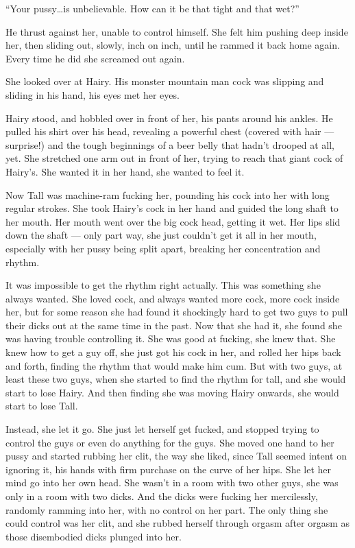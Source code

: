 \documentclass[letterpaper]{article}
\begin{document}
``Your pussy\ldots is unbelievable. How can it be that tight and that wet?''

He thrust against her, unable to control himself.
She felt him pushing deep inside her, then sliding out, slowly, inch on inch, until he rammed it back home again.
Every time he did she screamed out again.

She looked over at Hairy.
His monster mountain man cock was slipping and sliding in his hand, his eyes met her eyes.

Hairy stood, and hobbled over in front of her, his pants around his ankles.
He pulled his shirt over his head, revealing a powerful chest (covered with hair --- surprise!) and the tough beginnings of a beer belly that hadn't drooped at all, yet.
She stretched one arm out in front of her, trying to reach that giant cock of Hairy's. She wanted it in her hand, she wanted to feel it.

Now Tall was machine-ram fucking her, pounding his cock into her with long regular strokes.
She took Hairy's cock in her hand and guided the long shaft to her mouth.
Her mouth went over the big cock head, getting it wet.
Her lips slid down the shaft --- only part way, she just couldn't get it all in her mouth, especially with her pussy being split apart, breaking her concentration and rhythm.

It was impossible to get the rhythm right actually.
This was something she always wanted. 
She loved cock, and always wanted more cock, more cock inside her, but for some reason she had found it shockingly hard to get two guys to pull their dicks out at the same time in the past.
Now that she had it, she found she was having trouble controlling it.
She was good at fucking, she knew that.
She knew how to get a guy off, she just got his cock in her, and rolled her hips back and forth, finding the rhythm that would make him cum.
But with two guys, at least these two guys, when she started to find the rhythm for tall, and she would start to lose Hairy.
And then finding she was moving Hairy onwards, she would start to lose Tall.

Instead, she let it go. She just let herself get fucked, and stopped trying to control the guys or even do anything for the guys.
She moved one hand to her pussy and started rubbing her clit, the way she liked, since Tall seemed intent on ignoring it, his hands with firm purchase on the curve of her hips.
She let her mind go into her own head.
She wasn't in a room with two other guys, she was only in a room with two dicks.
And the dicks were fucking her mercilessly, randomly ramming into her, with no control on her part.
The only thing she could control was her clit, and she rubbed herself through orgasm after orgasm as those disembodied dicks plunged into her.
\end{document}
